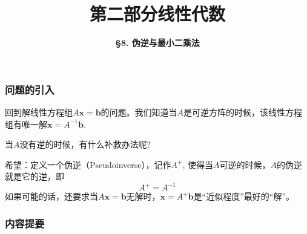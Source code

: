 



\title[Linear Algebra]{\LARGE \bfseries 第二部分\quad 线性代数} %
\author[Pseudoinverse and Least Squares] %
{\Large \bfseries \S 8. 伪逆与最小二乘法}
\date{}






\begin{frame}

\titlepage %

\end{frame}


\begin{frame}
\frametitle{问题的引入}

回到解线性方程组$A\mathbf{x} = \mathbf{b}$的问题。我们知道当$A$是可逆方阵的时候，该线性方程组有唯一解$\mathbf{x} = A^{-1}\mathbf{b}$.

\vspace{1em}

当$A$没有逆的时候，有什么补救办法呢?

\vspace{1em}

希望：定义一个伪逆（Pseudoinverse），记作$A^+$, 使得当$A$可逆的时候，$A$的伪逆就是它的逆，即
\[A^+ = A^{-1}\]
如果可能的话，还要求当$A\mathbf{x} = \mathbf{b}$无解时，$\mathbf{x} = A^+\mathbf{b}$是``近似程度''最好的``解''。

\end{frame}


\begin{frame}
\frametitle{内容提要} %
\tableofcontents %
\end{frame}

